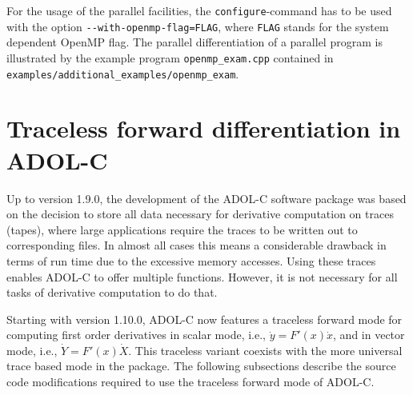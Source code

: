 \documentclass[11pt,twoside]{article}
\begin{document}
For the usage of the parallel facilities, the \verb=configure=-command
has to be used with the option \verb?--with-openmp-flag=FLAG?, where 
\verb=FLAG= stands for the system dependent OpenMP flag.
The parallel differentiation of a parallel program is illustrated
by the example program \verb=openmp_exam.cpp= contained in \verb=examples/additional_examples/openmp_exam=.
%
%
\section{Traceless forward differentiation in ADOL-C}
\label{traceless}
%
Up to version 1.9.0, the development of the ADOL-C software package
was based on the decision to store all data necessary for derivative
computation on traces (tapes), where large applications require the traces to be
written out to corresponding files. In almost all cases this means
a considerable drawback in terms of run time due to the excessive
memory accesses. Using these traces enables ADOL-C to offer multiple
functions. However, it is not necessary for all tasks of derivative
computation to do that. 

Starting with version 1.10.0, ADOL-C now features a traceless forward
mode for computing first order derivatives in scalar mode, i.e.,
$\dot{y} = F'(x)\dot{x}$, and in vector mode, i.e., $\dot{Y} = F'(x)\dot{X}$. 
This traceless variant coexists with the more universal
trace based mode in the package. The following subsections describe
the source code modifications required to use the traceless forward mode of
ADOL-C.  
%
\end{document}
